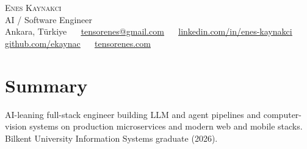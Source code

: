 \documentclass[letterpaper,10pt]{article}
\begin{document}
\begin{center}
    {\Huge \scshape Enes Kaynakcı} \\ \vspace{3pt}
    {\large AI / Software Engineer} \\ \vspace{3pt}
    \small Ankara, Türkiye ~\textbar~ \href{mailto:tensorenes@gmail.com}{\underline{tensorenes@gmail.com}} ~\textbar~ \href{https://www.linkedin.com/in/enes-kaynakci/}{\underline{linkedin.com/in/enes-kaynakci}} ~\textbar~ \href{https://github.com/ekaynac}{\underline{github.com/ekaynac}} ~\textbar~ \href{https://tensorenes.com}{\underline{tensorenes.com}}
\end{center}

\section{Summary}
\small{AI-leaning full-stack engineer building LLM and agent pipelines and computer-vision systems on production microservices and modern web and mobile stacks. Bilkent University Information Systems graduate (2026).}
\vspace{-4pt}
\end{document}
